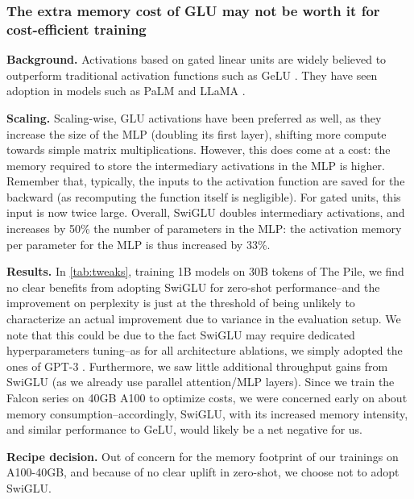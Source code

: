 \documentclass{article}
\begin{document}
\subsubsection{The extra memory cost of GLU may not be worth it for cost-efficient training}

\textbf{Background.} Activations based on gated linear units \citep{shazeer2020glu} are widely believed to outperform traditional activation functions such as GeLU \citep{what_lang_model}. They have seen adoption in models such as PaLM and LLaMA \citep{palm, llama, llama2}. 

\textbf{Scaling.} Scaling-wise, GLU activations have been preferred as well, as they increase the size of the MLP (doubling its first layer), shifting more compute towards simple matrix multiplications. However, this does come at a cost: the memory required to store the intermediary activations in the MLP is higher. Remember that, typically, the inputs to the activation function are saved for the backward (as recomputing the function itself is negligible). For gated units, this input is now twice large. Overall, SwiGLU doubles intermediary activations, and increases by 50\% the number of parameters in the MLP: the activation memory per parameter for the MLP is thus increased by 33\%.

\textbf{Results.} In \cref{tab:tweaks}, training 1B models on 30B tokens of The Pile, we find no clear benefits from adopting SwiGLU for zero-shot performance--and the improvement on perplexity is just at the threshold of being unlikely to characterize an actual improvement due to variance in the evaluation setup. We note that this could be due to the fact SwiGLU may require dedicated hyperparameters tuning--as for all architecture ablations, we simply adopted the ones of GPT-3 \citep{brown2020gpt3}. Furthermore, we saw little additional throughput gains from SwiGLU (as we already use parallel attention/MLP layers). Since we train the Falcon series on 40GB A100 to optimize costs, we were concerned early on about memory consumption--accordingly, SwiGLU, with its increased memory intensity, and similar performance to GeLU, would likely be a net negative for us. 

\begin{mdframed}
\textbf{Recipe decision.} Out of concern for the memory footprint of our trainings on A100-40GB, and because of no clear uplift in zero-shot, we choose not to adopt SwiGLU.
\end{mdframed}
\end{document}
